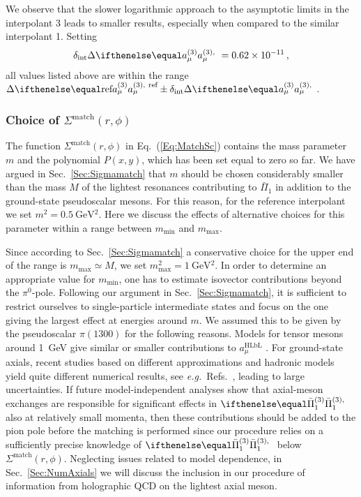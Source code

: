 We observe that the slower logarithmic approach to the asymptotic limits in the interpolant 3 leads to smaller results, especially when compared to the similar interpolant 1. Setting
\begin{equation}
\delta_\text{int} \Delta \aPion = \num{0.62e-11}\,,
\end{equation}
all values listed above are within the range $\Delta \aPion[\text{ref}] \pm \delta_\text{int} \Delta \aPion$.


\subsubsection{Choice of \texorpdfstring{$\Sigma^\text{match}(r,\phi)$}{sigma match}}
\label{Sec:NumMatch}
The function $\Sigma^\text{match}(r,\phi)$ in Eq.~(\ref{Eq:MatchSc}) contains the mass parameter $m$ 
and the polynomial $P(x,y)$, which has been set equal to zero so far. 
We have argued in Sec.~\ref{Sec:Sigmamatch} that $m$ should be chosen considerably smaller than the mass $M$ of the lightest resonances contributing to $\bar{\Pi}_1$ in addition to the ground-state pseudoscalar mesons. For this reason, for the reference interpolant we set $m^2=\SI{0.5}{\GeV^2}$. Here we discuss the effects of alternative choices for this parameter within a range between $m_\text{min}$ and $m_\text{max}$. 

Since according to Sec.~\ref{Sec:Sigmamatch} a conservative choice for the upper end of the range is $m_\text{max} \simeq M$, we set $m_\text{max}^2 = \SI{1}{\GeV^2}$. In order to determine an appropriate value for $m_\text{min}$, one has to estimate isovector contributions beyond the $\pi^0$-pole. Following our argument in Sec.~\ref{Sec:Sigmamatch}, it is sufficient to restrict ourselves to single-particle intermediate states and focus on the one giving the largest effect at energies around $m$. We assumed this to be given by the pseudoscalar $\pi(1300)$ for the following reasons. Models for tensor mesons around \SI{1}{\GeV} give similar or smaller contributions to $a_\mu^\text{HLbL}$ \cite{Pauk:2014rta, Danilkin:2016hnh, Danilkin:2019mhd}.
For ground-state axials, recent studies based on different approximations and hadronic models yield quite different numerical results, see {\it e.g.}\ Refs.~\cite{Pauk:2014rta,Roig:2019reh,HolographyVienna,HolographyItaly}, leading to large uncertainties. If future model-independent analyses show that axial-meson exchanges are responsible for significant effects in $\Pipion$ also at relatively small momenta, then these contributions should be added to the pion pole before the matching is performed since our procedure relies on a sufficiently precise knowledge of $\Pipion$ below $\Sigma^\text{match}(r,\phi)$. Neglecting issues related to model dependence, in Sec.~\ref{Sec:NumAxials} we will discuss the inclusion in our procedure of information from holographic QCD on the lightest axial meson.

